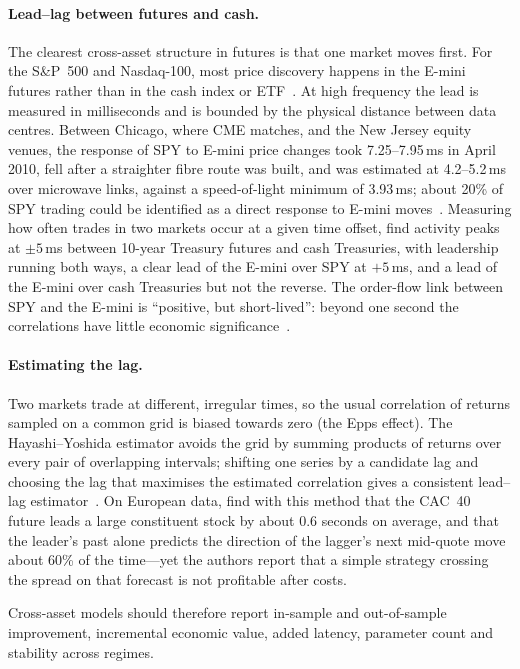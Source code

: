 \paragraph{Lead--lag between futures and cash.} The clearest cross-asset structure in futures is that
one market moves first. For the S\&P~500 and Nasdaq-100, most price discovery happens in the E-mini
futures rather than in the cash index or ETF~\citep{hasbrouck2003}. At high frequency the lead is
measured in milliseconds and is bounded by the physical distance between data centres. Between Chicago,
where CME matches, and the New Jersey equity venues, the response of SPY to E-mini price changes took
7.25--7.95\,ms in April 2010, fell after a straighter fibre route was built, and was estimated at 4.2--5.2\,ms
over microwave links, against a speed-of-light minimum of 3.93\,ms; about 20\% of SPY trading could be
identified as a direct response to E-mini moves~\citep{laughlin2014}. Measuring how often trades in two
markets occur at a given time offset, \citet{dobrev2017} find activity peaks at $\pm 5$\,ms between
10-year Treasury futures and cash Treasuries, with leadership running both ways, a clear lead of the
E-mini over SPY at $+5$\,ms, and a lead of the E-mini over cash Treasuries but not the reverse. The
order-flow link between SPY and the E-mini is ``positive, but short-lived'': beyond one second the
correlations have little economic significance~\citep{garrison2019}.

\paragraph{Estimating the lag.} Two markets trade at different, irregular times, so the usual
correlation of returns sampled on a common grid is biased towards zero (the Epps effect). The
Hayashi--Yoshida estimator avoids the grid by summing products of returns over every pair of
overlapping intervals; shifting one series by a candidate lag and choosing the lag that maximises the
estimated correlation gives a consistent lead--lag estimator~\citep{hoffmann2013leadlag}. On European data,
\citet{huth2014} find with this method that the CAC~40 future leads a large constituent stock by about
0.6 seconds on average, and that the leader's past alone predicts the direction of the lagger's next
mid-quote move about 60\% of the time---yet the authors report that a simple strategy crossing the
spread on that forecast is not profitable after costs.

Cross-asset models should therefore report in-sample and out-of-sample improvement, incremental
economic value, added latency, parameter count and stability across regimes.

